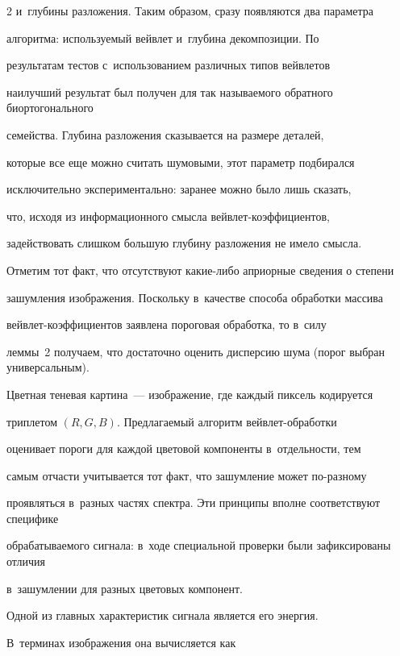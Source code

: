 \begin{multicols}{2}
и~глубины разложения. Таким образом, сразу появляются два параметра

алгоритма: используемый вейвлет и~глубина декомпозиции. По

результатам тестов с~использованием различных типов вейвлетов

наилучший результат был получен для так называемого обратного биортогонального

семейства. Глубина разложения сказывается на размере деталей,

которые все еще можно считать шумовыми, этот параметр подбирался

исключительно экспериментально: заранее можно было лишь сказать,

что, исходя из информационного смысла вейв\-лет-ко\-эф\-фи\-ци\-ен\-тов,

задействовать слишком большую глубину разложения не имело смысла.



Отметим тот факт, что отсутствуют ка\-кие-ли\-бо априорные сведения о степени 

зашумления изображения. Поскольку в~качестве способа обработки массива 

вейв\-лет-ко\-эф\-фи\-ци\-ен\-тов заявлена пороговая обработка, то в~силу 

леммы~2 получаем, что достаточно оценить дисперсию шума (порог выбран универсальным).



Цветная теневая картина~--- изображение, где каждый пиксель кодируется 

триплетом $(R,G,B)$. Предлагаемый алгоритм вейв\-лет-об\-ра\-бот\-ки 

оценивает пороги для каждой цветовой компоненты в~отдельности, тем 

самым отчасти учитывается тот факт, что зашумление может по-раз\-но\-му 

проявляться в~разных частях спектра. Эти принципы вполне соответствуют специфике 

обрабатываемого сигнала: в~ходе специальной проверки были зафиксированы отличия 

в~зашумлении для разных цветовых компонент.



Одной из главных характеристик сигнала является его энергия. 

В~терминах изображения она вычисляется как

\begin{equation}


\end{equation}
\end{multicols}
